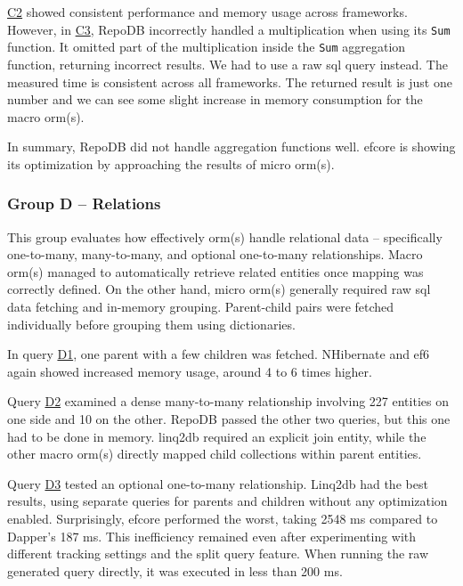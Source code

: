 \hyperref[query:c2]{C2} showed consistent performance and memory usage across frameworks. However, in \hyperref[query:c3]{C3}, RepoDB incorrectly handled a multiplication when using its \texttt{Sum} function. It omitted part of the multiplication inside the \texttt{Sum} aggregation function, returning incorrect results. We had to use a raw \acrshort{sql} query instead. The measured time is consistent across all frameworks. The returned result is just one number and we can see some slight increase in memory consumption for the macro \acrshort{orm}(s).

In summary, RepoDB did not handle aggregation functions well. \acrshort{efcore} is showing its optimization by approaching the results of micro \acrshort{orm}(s).

\subsubsection{Group D -- Relations}
This group evaluates how effectively \acrshort{orm}(s) handle relational data -- specifically one-to-many, many-to-many, and optional one-to-many relationships. Macro \acrshort{orm}(s) managed to automatically retrieve related entities once mapping was correctly defined. On the other hand, micro \acrshort{orm}(s) generally required raw \acrshort{sql} data fetching and in-memory grouping. Parent-child pairs were fetched individually before grouping them using dictionaries.

In query \hyperref[query:d1]{D1}, one parent with a few children was fetched. NHibernate and \acrshort{ef}6 again showed increased memory usage, around 4 to 6 times higher.

Query \hyperref[query:d2]{D2} examined a dense many-to-many relationship involving 227 entities on one side and 10 on the other. RepoDB passed the other two queries, but this one had to be done in memory. linq2db required an explicit join entity, while the other macro \acrshort{orm}(s) directly mapped child collections within parent entities.

Query \hyperref[query:d3]{D3} tested an optional one-to-many relationship. Linq2db had the best results, using separate queries for parents and children without any optimization enabled. Surprisingly, \acrshort{efcore} performed the worst, taking 2548 ms compared to Dapper's 187 ms. This inefficiency remained even after experimenting with different tracking settings and the split query feature. When running the raw generated query directly, it was executed in less than 200 ms.

